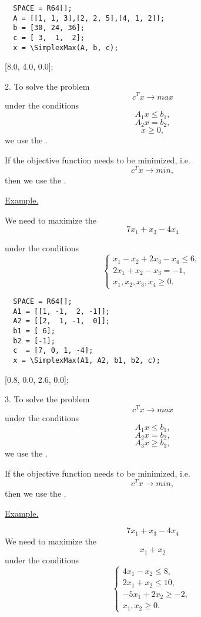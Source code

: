 \begin{verbatim}
  SPACE = R64[];
  A = [[1, 1, 3],[2, 2, 5],[4, 1, 2]];
  b = [30, 24, 36];
  c = [ 3,  1,  2];
  x = \SimplexMax(A, b, c);
\end{verbatim}


\ex{}
{[8.0, 4.0, 0.0];}

2. To solve the problem
$$c^Tx \rightarrow max$$
under the conditions
$$A_1 x\leqslant b_1,$$
$$A_2 x=         b_2,$$
$$ x \geqslant 0,$$
we use the .

If the objective function needs to be minimized, i.e. $$c^Tx \rightarrow min,$$  then we use the   .

\underline{%
Example.%
}

We need to maximize the $$7x_1 + x_3 - 4x_4$$

under the conditions
$$%
  \left\{
  \begin{array}{c} %
   x_1 - x_2 + 2x_3 - x_4 \leqslant  6,\ \\
  2x_1 + x_2 - x_3 = -1,\ \\
   x_1,  x_2,   x_3,  x_4 \geqslant  0. %
  \end{array}
  \right. %
$$

\begin{verbatim}
  SPACE = R64[];
  A1 = [[1, -1,  2, -1]];
  A2 = [[2,  1, -1,  0]];
  b1 = [ 6];
  b2 = [-1];
  c  = [7, 0, 1, -4];
  x = \SimplexMax(A1, A2, b1, b2, c);
\end{verbatim}
\ex{}
{[0.8, 0.0, 2.6, 0.0];}

3. To solve the problem
$$c^Tx \rightarrow max$$
under the conditions
$$A_1 x\leqslant b_1,$$
$$A_2 x=         b_2,$$
$$A_3 x\geqslant b_3,$$
we use the .

If the objective function needs to be minimized, i.e. $$c^Tx \rightarrow min,$$  then we use the   .

\underline{%
Example.%
}

$$7x_1 + x_3 - 4x_4$$
We need to maximize the 
  $$x_1 + x_2$$
under the conditions
$$%
  \left\{
  \begin{array}{c} %
   4x_1 -  x_2 \leqslant  8,\ \\
   2x_1 +  x_2 \leqslant 10,\ \\
  -5x_1 + 2x_2 \geqslant -2,\ \\
   x_1,    x_2 \geqslant  0.%
  \end{array}
  \right. %
$$

